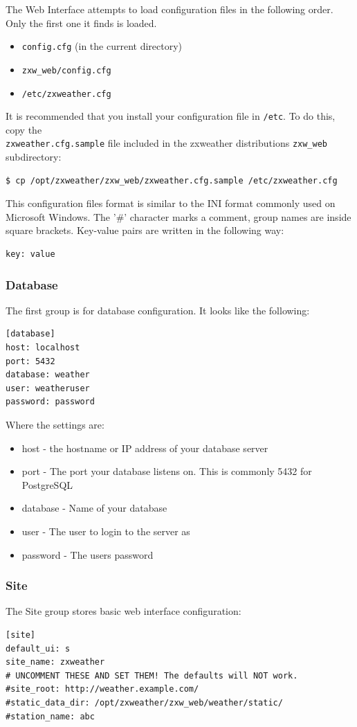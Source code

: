 \documentclass[a4paper,10pt,draft]{book}
\begin{document}
The Web Interface attempts to load configuration files in the following order. Only the first one it finds is loaded.
\begin{itemize}
\item \verb|config.cfg| (in the current directory)
\item \verb|zxw_web/config.cfg|
\item \verb|/etc/zxweather.cfg|
\end{itemize}

It is recommended that you install your configuration file in \verb|/etc|. To do this, copy the \\ \verb|zxweather.cfg.sample| file included in the zxweather distributions \verb|zxw_web| subdirectory:
\begin{verbatim}
$ cp /opt/zxweather/zxw_web/zxweather.cfg.sample /etc/zxweather.cfg
\end{verbatim}

This configuration files format is similar to the INI format commonly used on Microsoft Windows. The '\#' character marks a comment, group names are inside square brackets. Key-value pairs are written in the following way:
\begin{verbatim}
key: value
\end{verbatim}

\subsubsection{Database}
The first group is for database configuration. It looks like the following:
\begin{verbatim}
[database]
host: localhost
port: 5432
database: weather
user: weatheruser
password: password
\end{verbatim}

Where the settings are:
\begin{itemize}
\item host - the hostname or IP address of your database server
\item port - The port your database listens on. This is commonly 5432 for PostgreSQL
\item database - Name of your database
\item user - The user to login to the server as
\item password - The users password
\end{itemize}


\subsubsection{Site}
The Site group stores basic web interface configuration:
\begin{verbatim}
[site]
default_ui: s
site_name: zxweather
# UNCOMMENT THESE AND SET THEM! The defaults will NOT work.
#site_root: http://weather.example.com/
#static_data_dir: /opt/zxweather/zxw_web/weather/static/
#station_name: abc
\end{verbatim}
\end{document}
